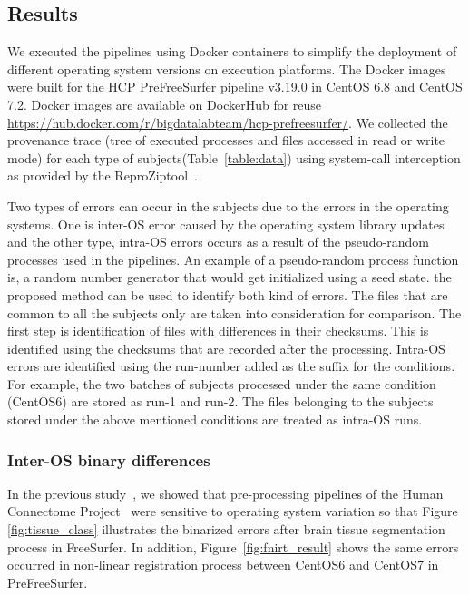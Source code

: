 \documentclass[a4paper,num-refs]{oup-contemporary}
\newcommand{\reprozip}[0]{ReproZip}
\begin{document}
\subsection{Results}

We executed the pipelines using Docker containers to simplify the 
deployment of different operating system versions on execution 
platforms. The Docker images were built for the HCP PreFreeSurfer 
pipeline v3.19.0 in 
CentOS 6.8 and CentOS 7.2. Docker images are available on DockerHub for 
reuse \url{https://hub.docker.com/r/bigdatalabteam/hcp-prefreesurfer/}. 
We collected the provenance trace (tree of executed processes and files 
accessed in read or write mode) for each type of 
subjects(Table~\ref{table:data}) using system-call interception as 
provided by the \reprozip tool~\cite{Chirigati2016}.

Two types of errors can occur in the subjects due to the 
errors in the operating systems. One is inter-OS error caused by the 
operating system library updates and the other type, intra-OS errors 
occurs as a result of the pseudo-random processes used in the 
pipelines. An example of a pseudo-random process function is, a random 
number generator that would get initialized using a seed state. the 
proposed method can be used to identify both kind of errors. The files 
that are common to all the subjects only are taken into consideration 
for comparison. The first step is identification of files with 
differences in their checksums. This is identified using the checksums 
that are recorded after the processing. Intra-OS errors are identified 
using the run-number added as the suffix for the conditions. For 
example, the two batches of subjects processed under the same condition 
(CentOS6) are stored as run-1 and run-2. The files belonging to the 
subjects stored under the above mentioned conditions are treated as 
intra-OS runs.


\subsubsection{Inter-OS binary differences}


In the previous study~\cite{Scaria2017}, we showed that pre-processing 
pipelines of the Human Connectome Project~\cite{Glasser2013} were 
sensitive to operating system variation so that Figure 
\ref{fig:tissue_class} illustrates the binarized errors after brain 
tissue segmentation process in FreeSurfer. In addition, 
Figure~\ref{fig:fnirt_result} shows the same errors occurred in 
non-linear registration process between CentOS6 and CentOS7 in PreFreeSurfer. 
\end{document}

